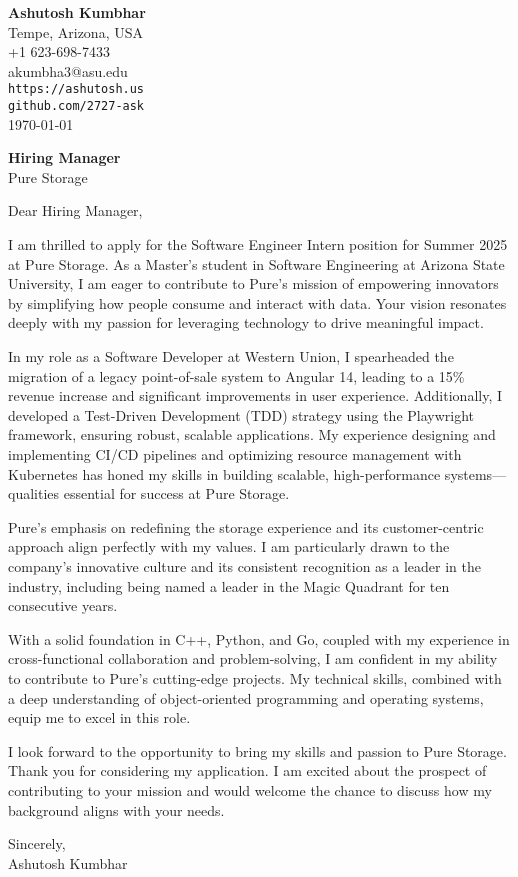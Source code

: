 \documentclass[11pt]{article}
\begin{document}
\begin{flushleft}
\textbf{Ashutosh Kumbhar} \\
Tempe, Arizona, USA \\
+1 623-698-7433 \\
akumbha3@asu.edu \\
\texttt{https://ashutosh.us} \\
\texttt{github.com/2727-ask} \\
\today
\end{flushleft}

\vspace{0.5em}

\textbf{Hiring Manager} \\
Pure Storage \\

\vspace{1em}

Dear Hiring Manager,

I am thrilled to apply for the Software Engineer Intern position for Summer 2025 at Pure Storage. As a Master's student in Software Engineering at Arizona State University, I am eager to contribute to Pure's mission of empowering innovators by simplifying how people consume and interact with data. Your vision resonates deeply with my passion for leveraging technology to drive meaningful impact.

In my role as a Software Developer at Western Union, I spearheaded the migration of a legacy point-of-sale system to Angular 14, leading to a 15\% revenue increase and significant improvements in user experience. Additionally, I developed a Test-Driven Development (TDD) strategy using the Playwright framework, ensuring robust, scalable applications. My experience designing and implementing CI/CD pipelines and optimizing resource management with Kubernetes has honed my skills in building scalable, high-performance systems—qualities essential for success at Pure Storage.

Pure's emphasis on redefining the storage experience and its customer-centric approach align perfectly with my values. I am particularly drawn to the company's innovative culture and its consistent recognition as a leader in the industry, including being named a leader in the Magic Quadrant for ten consecutive years.

With a solid foundation in C++, Python, and Go, coupled with my experience in cross-functional collaboration and problem-solving, I am confident in my ability to contribute to Pure's cutting-edge projects. My technical skills, combined with a deep understanding of object-oriented programming and operating systems, equip me to excel in this role.

I look forward to the opportunity to bring my skills and passion to Pure Storage. Thank you for considering my application. I am excited about the prospect of contributing to your mission and would welcome the chance to discuss how my background aligns with your needs.

Sincerely, \\
Ashutosh Kumbhar
\end{document}

